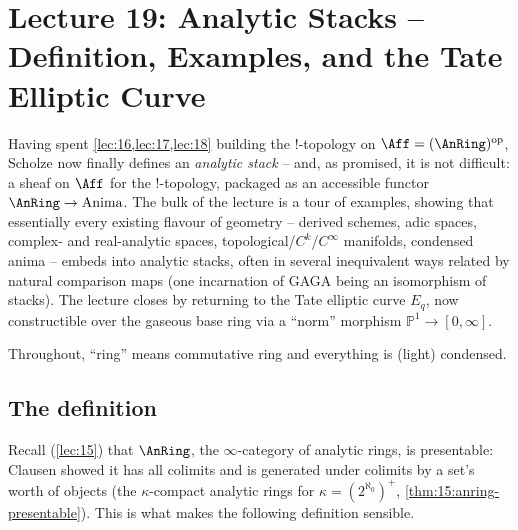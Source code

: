 \section{Lecture 19: Analytic Stacks -- Definition, Examples, and the Tate Elliptic Curve}
\label{lec:19}

Having spent \cref{lec:16,lec:17,lec:18} building the $!$-topology on
$\Aff=(\AnRing)^{\mathrm{op}}$, Scholze now finally defines an
\emph{analytic stack} -- and, as promised, it is not difficult: a sheaf on
$\Aff$ for the $!$-topology, packaged as an accessible functor
$\AnRing\to\operatorname{Anima}$. The bulk of the lecture is a tour of examples,
showing that essentially every existing flavour of geometry -- derived schemes,
adic spaces, complex- and real-analytic spaces, topological/$C^k$/$C^\infty$
manifolds, condensed anima -- embeds into analytic stacks, often in several
inequivalent ways related by natural comparison maps (one incarnation of GAGA
being an isomorphism of stacks). The lecture closes by returning to the Tate
elliptic curve $E_q$, now constructible over the gaseous base ring via a
``norm'' morphism $\mathbb P^1\to[0,\infty]$.

Throughout, ``ring'' means commutative ring and everything is (light) condensed.

\subsection{The definition}
\label{subsec:19:definition}

Recall (\cref{lec:15}) that $\AnRing$, the $\infty$-category of analytic rings,
is presentable: Clausen showed it has all colimits and is generated under
colimits by a set's worth of objects (the $\kappa$-compact analytic rings for
$\kappa=(2^{\aleph_0})^+$, \cref{thm:15:anring-presentable}). This is what makes
the following definition sensible.

